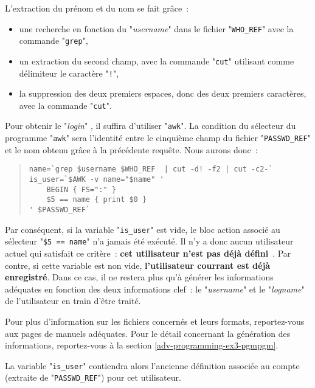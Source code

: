 L'extraction du pr{\'e}nom et du nom se fait gr{\^a}ce~:
\begin{itemize}
	\item	une recherche en fonction du "{\sl username}" dans le fichier
			"{\tt WHO\_REF}" avec la commande "{\tt grep}",
	\item	un extraction du second champ, avec la commande "{\tt cut}"
			utilisant comme d{\'e}limiteur le caract{\`e}re "\verb=!=",
	\item	la suppression des deux premiers espaces, donc des deux premiers
			caract{\`e}res, avec la commande "{\tt cut}".
\end{itemize}
Pour obtenir le "{\sl login}" {\Unix}, il suffira d'utiliser "{\tt awk}".
La condition du s{\'e}lecteur du programme "{\tt awk}" sera l'identit{\'e} entre
le cinqui{\`e}me champ du fichier "{\tt PASSWD\_REF}" et le nom obtenu gr{\^a}ce
{\`a} la pr{\'e}c{\'e}dente requ{\^e}te.
Nous aurons donc~:
\begin{quote}
\begin{verbatim}
name=`grep $username $WHO_REF  | cut -d! -f2 | cut -c2-`
is_user=`$AWK -v name="$name" '
    BEGIN { FS=":" }
    $5 == name { print $0 }
' $PASSWD_REF`
\end{verbatim}
\end{quote}

Par cons{\'e}quent, si la variable "{\tt is\_user}" est vide, le bloc action
associ{\'e} au s{\'e}lecteur "\verb,$5 == name," n'a jamais {\'e}t{\'e} ex{\'e}cut{\'e}. Il n'y
a donc aucun utilisateur actuel qui satisfait ce crit{\`e}re~: {\bf cet utilisateur
n'est pas d{\'e}j{\`a} d{\'e}fini}~. Par contre, si cette variable est non vide,
{\bf l'utilisateur courrant est d{\'e}j{\`a} enregistr{\'e}}. Dans ce cas, il ne restera plus
qu'{\`a} g{\'e}n{\'e}rer les informations ad{\'e}quates en fonction des deux informations clef~:
le "{\sl username}" {\OpenVMS} et le "{\sl logname}" {\Unix} de
l'utilisateur en train d'{\^e}tre trait{\'e}.

Pour plus d'information sur les fichiers concern{\'e}s et leurs formats, reportez-vous
aux pages de manuels ad{\'e}quates. Pour le d{\'e}tail concernant la g{\'e}n{\'e}ration
des informations, reportez-vous {\`a} la section \ref{adv-programming-ex3-pgmpgm}.

\begin{remarque}
La variable "{\tt is\_user}" contiendra alors l'ancienne d{\'e}finition
associ{\'e}e au compte {\Unix} (extraite de "{\tt PASSWD\_REF}") pour
cet utilisateur.
\end{remarque}


